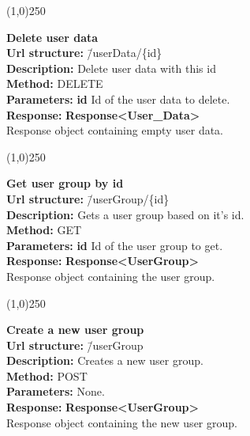 \documentclass[11pt]{article}
\begin{document}
\begin{center}\line(1,0){250}\end{center}

\begin{tabbing}
\textbf{Delete user data} \\
\textcolor{black!60}{\textbf{Url structure:}} \hspace{0.2in} \= /userData/\{id\} \\
\textcolor{black!60}{\textbf{Description:}}  \> Delete user data with this id \\
\textcolor{black!60}{\textbf{Method:}} \> DELETE \\
\textcolor{black!60}{\textbf{Parameters:}} \> \textbf{id} Id of the user data to delete. \\
\textcolor{black!60}{\textbf{Response:}} \> \textbf{Response<User\_Data>} \\
\> Response object containing empty user data.
\end{tabbing}

\begin{center}\line(1,0){250}\end{center}

\begin{tabbing}
\textbf{Get user group by id} \\
\textcolor{black!60}{\textbf{Url structure:}} \hspace{0.2in} \= /userGroup/\{id\} \\
\textcolor{black!60}{\textbf{Description:}}  \> Gets a user group based on it's id. \\
\textcolor{black!60}{\textbf{Method:}} \> GET \\
\textcolor{black!60}{\textbf{Parameters:}} \> \textbf{id} Id of the user group to get. \\
\textcolor{black!60}{\textbf{Response:}} \> \textbf{Response<UserGroup>} \\
\> Response object containing the user group.
\end{tabbing}

\begin{center}\line(1,0){250}\end{center}

\begin{tabbing}
\textbf{Create a new user group} \\
\textcolor{black!60}{\textbf{Url structure:}} \hspace{0.2in} \= /userGroup \\
\textcolor{black!60}{\textbf{Description:}}  \> Creates a new user group. \\
\textcolor{black!60}{\textbf{Method:}} \> POST \\
\textcolor{black!60}{\textbf{Parameters:}} \> None. \\
\textcolor{black!60}{\textbf{Response:}} \> \textbf{Response<UserGroup>} \\
\> Response object containing the new user group.
\end{tabbing}
\end{document}
